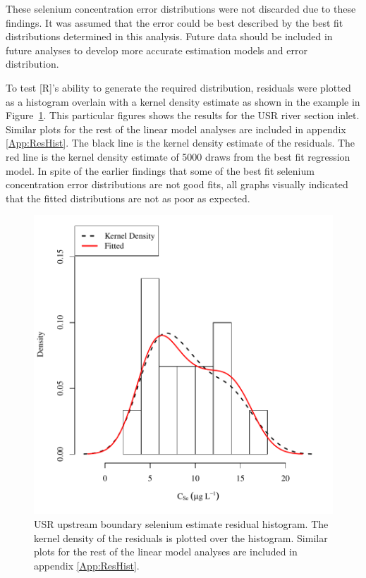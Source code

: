 \begin{linenumbers}
These selenium concentration error distributions were not discarded due to these findings.  It was assumed that the error could be best described by the best fit distributions determined in this analysis.  Future data should be included in future analyses to develop more accurate estimation models and error distribution.

To test [R]'s ability to generate the required distribution, residuals were plotted as a histogram overlain with a kernel density estimate as shown in the example in Figure~\ref{fig:ExampleResHist}.  This particular figures shows the results for the USR river section inlet.  Similar plots for the rest of the linear model analyses are included in appendix \ref{App:ResHist}.  The black line is the kernel density estimate of the residuals.  The red line is the kernel density estimate of 5000 draws from the best fit regression model.  In spite of the earlier findings that some of the best fit selenium concentration error distributions are not good fits, all graphs visually indicated that the fitted distributions are not as poor as expected.

\begin{figure}[htbp]
	\begin{center}
		\includegraphics[width=6in]{"Figures/Results_USR/Conc Model ResDist U163"}
		\caption[USR upstream boundary selenium estimate residual histogram.]{USR upstream boundary selenium estimate residual histogram.  The kernel density of the residuals is plotted over the histogram.  Similar plots for the rest of the linear model analyses are included in appendix \ref{App:ResHist}.}
	\label{fig:ExampleResHist}
	\end{center}
\end{figure}


\end{linenumbers}
